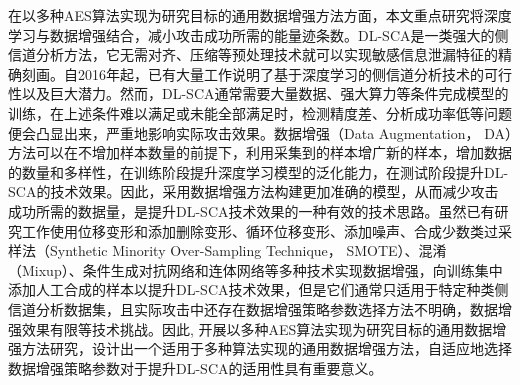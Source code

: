 {	%
	在以多种AES算法实现为研究目标的通用数据增强方法方面，本文重点研究将深度学习与数据增强结合，减小攻击成功所需的能量迹条数。DL-SCA是一类强大的侧信道分析方法，它无需对齐、压缩等预处理技术就可以实现敏感信息泄漏特征的精确刻画。自2016年起，已有大量工作\citep{Maghrebi16,Cagli17,Zaid20,Wouters20,Wu22}说明了基于深度学习的侧信道分析技术的可行性以及巨大潜力。然而，DL-SCA通常需要大量数据、强大算力等条件完成模型的训练，在上述条件难以满足或未能全部满足时，检测精度差、分析成功率低等问题便会凸显出来，严重地影响实际攻击效果。数据增强（Data Augmentation， DA）方法可以在不增加样本数量的前提下，利用采集到的样本增广新的样本，增加数据的数量和多样性\citep{Krizhevsky12,Simard03}，在训练阶段提升深度学习模型的泛化能力，在测试阶段提升DL-SCA的技术效果。因此，采用数据增强方法构建更加准确的模型，从而减少攻击成功所需的数据量，是提升DL-SCA技术效果的一种有效的技术思路。虽然已有研究工作\citep{Cagli17,Pu17,Kim19,Picek19,Won20,Luo21,Mukhtar22}使用位移变形和添加删除变形、循环位移变形、添加噪声、合成少数类过采样法（Synthetic Minority Over-Sampling Technique， SMOTE）\citep{Chawla02}、混淆（Mixup）\citep{Zhang17}、条件生成对抗网络和连体网络等多种技术实现数据增强，向训练集中添加人工合成的样本以提升DL-SCA技术效果，但是它们通常只适用于特定种类侧信道分析数据集，且实际攻击中还存在数据增强策略参数选择方法不明确，数据增强效果有限等技术挑战。因此, 开展以多种AES算法实现为研究目标的通用数据增强方法研究，设计出一个适用于多种算法实现的通用数据增强方法，自适应地选择数据增强策略参数对于提升DL-SCA的适用性具有重要意义。
	
}
